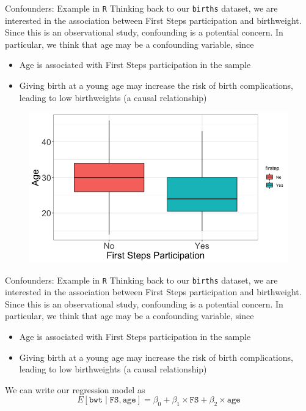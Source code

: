 \documentclass[10pt,t]{beamer}
\begin{document}
\begin{frame}{Confounders: Example in \texttt{R}}
Thinking back to our \texttt{births} dataset, we are interested in the association between First Steps participation and birthweight. Since this is an observational study, confounding is a potential concern. In particular, we think that age may be a confounding variable, since 

\vspace{0.3cm}

\begin{itemize}
	\item Age is associated with First Steps participation in the sample
	\item Giving birth at a young age may increase the risk of birth complications, leading to low birthweights (a causal relationship)
\end{itemize} 

\begin{figure}
	\centering \includegraphics[scale=0.2]{age_firstep.png}
\end{figure}

\end{frame}

\begin{frame}{Confounders: Example in \texttt{R}}
Thinking back to our \texttt{births} dataset, we are interested in the association between First Steps participation and birthweight. Since this is an observational study, confounding is a potential concern. In particular, we think that age may be a confounding variable, since 

\vspace{0.3cm}

\begin{itemize}
	\item Age is associated with First Steps participation in the sample
	\item Giving birth at a young age may increase the risk of birth complications, leading to low birthweights (a causal relationship)
\end{itemize} 

\vspace{0.3cm}

We can write our regression model as
$$
E[\texttt{bwt} \mid \texttt{FS}, \texttt{age}] = \beta_0 + \beta_1 \times \texttt{FS} + \beta_2 \times \texttt{age}
$$
\end{frame}
\end{document}
